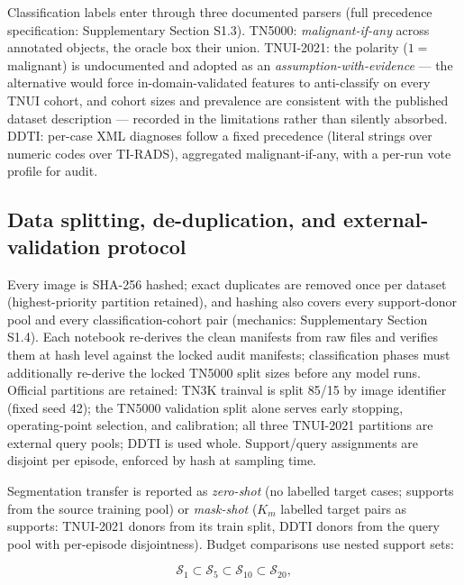 \documentclass[jimh,article,submit,moreauthors,pdftex]{Definitions/tsp}
\begin{document}
Classification labels enter through three documented parsers (full
precedence specification: Supplementary Section S1.3). TN5000:
\emph{malignant-if-any} across annotated objects, the oracle box their
union. TNUI-2021: the polarity ($1 = $ malignant) is undocumented and
adopted as an \emph{assumption-with-evidence} --- the alternative would
force in-domain-validated features to anti-classify on every TNUI
cohort, and cohort sizes and prevalence are consistent with the
published dataset description --- recorded in the limitations rather
than silently absorbed. DDTI: per-case XML diagnoses follow a fixed
precedence (literal strings over numeric codes over TI-RADS),
aggregated malignant-if-any, with a per-run vote profile for audit.

\subsection{Data splitting, de-duplication, and external-validation protocol}
\label{subsec:data_splitting}

Every image is SHA-256 hashed; exact duplicates are removed once per
dataset (highest-priority partition retained), and hashing also covers
every support-donor pool and every classification-cohort pair
(mechanics: Supplementary Section S1.4). Each notebook re-derives the
clean manifests from raw files and verifies them at hash level against
the locked audit manifests; classification phases must additionally
re-derive the locked TN5000 split sizes before any model runs. Official
partitions are retained: TN3K trainval is split 85/15 by image
identifier (fixed seed 42); the TN5000 validation split alone serves
early stopping, operating-point selection, and calibration; all three
TNUI-2021 partitions are external query pools; DDTI is used whole.
Support/query assignments are disjoint per episode, enforced by hash at
sampling time.

Segmentation transfer is reported as \emph{zero-shot} (no labelled
target cases; supports from the source training pool) or
\emph{mask-shot} ($K_m$ labelled target pairs as supports: TNUI-2021
donors from its train split, DDTI donors from the query pool with
per-episode disjointness). Budget comparisons use nested support sets:

\begin{equation}
  \mathcal{S}_1 \subset \mathcal{S}_5
  \subset \mathcal{S}_{10} \subset \mathcal{S}_{20},
  \label{eq:nested_support}
\end{equation}
\end{document}
